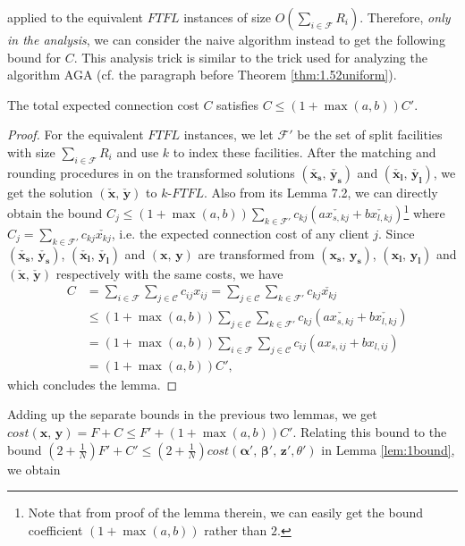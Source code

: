 \documentclass[10pt]{llncs}
\begin{document}
applied to the equivalent $FTFL$ instances of size $ $$O\left(\sum_{i\in\mathcal{F}}R_{i}\right)$.
Therefore, \textit{only in the analysis}, we can consider the naive
algorithm instead to get the following bound for $C$. This analysis
trick is similar to the trick used for analyzing the algorithm AGA
(cf. the paragraph before Theorem \ref{thm:1.52uniform}).
\begin{lemma}
The total expected connection cost $C$ satisfies $C\leq\left(1+\max\left(a,b\right)\right)C'$.\end{lemma}
\begin{proof}
For the equivalent $FTFL$ instances, we let $ $$\mathcal{F}'$ be
the set of split facilities with size $\sum_{i\in\mathcal{F}}R_{i}$
and use $k$ to index these facilities. After the matching and rounding
procedures in \cite{Swamy08FTFL2.076} on the transformed solutions
$\left(\check{\boldsymbol{x_{s}}},\,\check{\boldsymbol{y_{s}}}\right)$
and $\left(\check{\boldsymbol{x_{l}}},\,\check{\boldsymbol{y_{l}}}\right)$,
we get the solution $\left(\check{\boldsymbol{x}},\,\check{\boldsymbol{y}}\right)$
to $k$-$FTFL$. Also from its Lemma 7.2, we can directly obtain the
bound $C_{j}\leq\left(1+\max\left(a,b\right)\right)\sum_{k\in\mathcal{F}'}c_{kj}\left(a\check{x_{s,kj}}+b\check{x_{l,kj}}\right)$\footnote{Note that from proof of the lemma therein, we can easily get the bound
coefficient $\left(1+\max\left(a,b\right)\right)$ rather than $2$.} where $C_{j}=\sum_{k\in\mathcal{F}'}c_{kj}\check{x_{kj}}$, i.e.
the expected connection cost of any client $j$. Since $\left(\check{\boldsymbol{x_{s}}},\,\check{\boldsymbol{y_{s}}}\right)$,
$\left(\check{\boldsymbol{x_{l}}},\,\check{\boldsymbol{y_{l}}}\right)$
and $\left(\boldsymbol{x},\,\boldsymbol{y}\right)$ are transformed
from $\left(\boldsymbol{x_{s}},\,\boldsymbol{y_{s}}\right)$, $\left(\boldsymbol{x_{l}},\,\boldsymbol{y_{l}}\right)$
and $\left(\check{\boldsymbol{x}},\,\check{\boldsymbol{y}}\right)$
respectively with the same costs, we have
\begin{eqnarray*}
 & C & =\sum_{i\in\mathcal{F}}\sum_{j\in\mathcal{C}}c_{ij}x_{ij}=\sum_{j\in\mathcal{C}}\sum_{k\in\mathcal{F}'}c_{kj}\check{x_{kj}}\\
 &  & \leq\left(1+\max\left(a,b\right)\right)\sum_{j\in\mathcal{C}}\sum_{k\in\mathcal{F}'}c_{kj}\left(a\check{x_{s,kj}}+b\check{x_{l,kj}}\right)\\
 &  & =\left(1+\max\left(a,b\right)\right)\sum_{i\in\mathcal{F}}\sum_{j\in\mathcal{C}}c_{ij}\left(ax_{s,ij}+bx_{l,ij}\right)\\
 &  & =\left(1+\max\left(a,b\right)\right)C',
\end{eqnarray*}
which concludes the lemma.
\end{proof}
Adding up the separate bounds in the previous two lemmas, we get $cost\left(\boldsymbol{x},\,\boldsymbol{y}\right)=F+C\leq F'+\left(1+\max\left(a,b\right)\right)C'$.
Relating this bound to the bound $\left(2+\frac{1}{N}\right)F'+C'\leq\left(2+\frac{1}{N}\right)cost\left(\boldsymbol{\alpha'},\,\boldsymbol{\beta'},\,\boldsymbol{z'},\theta'\right)$
in Lemma \ref{lem:1bound}, we obtain
\end{document}
